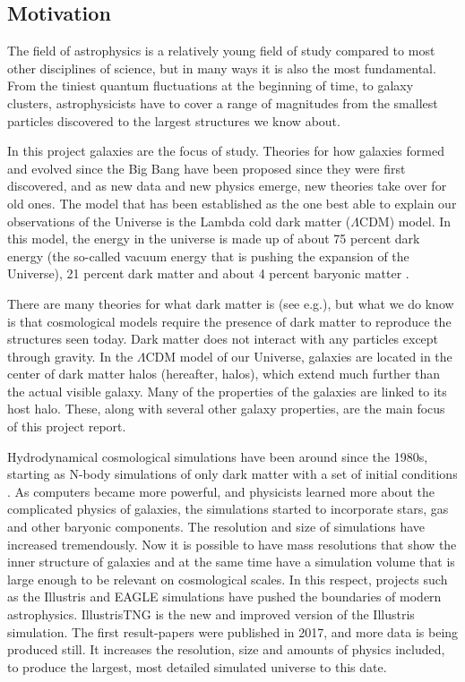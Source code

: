 
\noindent
\subsection{Motivation}
The field of astrophysics is a relatively young field of study compared to most other disciplines of science, but in many ways it is also the most fundamental. From the tiniest quantum fluctuations at the beginning of time, to galaxy clusters, astrophysicists have to cover a range of magnitudes from the smallest particles discovered to the largest structures we know about. 

In this project galaxies are the focus of study. Theories for how galaxies formed and evolved since the Big Bang have been proposed since they were first discovered, and as new data and new physics emerge, new theories take over for old ones. The model that has been established as the one best able to explain our observations of the Universe is the Lambda cold dark matter ($\Lambda$CDM) model. In this model, the energy in the universe is made up of about 75 percent dark energy (the so-called vacuum energy that is pushing the expansion of the Universe), 21 percent dark matter and about 4 percent baryonic matter \parencite{white}. 

There are many theories for what dark matter is (see e.g.\cite{Boveia2018}), but what we do know is that cosmological models require the presence of dark matter to reproduce the structures seen today. Dark matter does not interact with any particles except through gravity. In the $\Lambda$CDM model of our Universe, galaxies are located in the center of dark matter halos (hereafter, halos), which extend much further than the actual visible galaxy. Many of the properties of the galaxies are linked to its host halo. These, along with several other galaxy properties, are the main focus of this project report.

Hydrodynamical cosmological simulations have been around since the 1980s, starting as N-body simulations of only dark matter with a set of initial conditions \parencite{Frenk1983}. As computers became more powerful, and physicists learned more about the complicated physics of galaxies, the simulations started to incorporate stars, gas and other baryonic components. The resolution and size of simulations have increased tremendously. Now it is possible to have mass resolutions that show the inner structure of galaxies and at the same time have a simulation volume that is large enough to be relevant on cosmological scales. In this respect, projects such as the Illustris and EAGLE simulations have pushed the boundaries of modern astrophysics. IllustrisTNG is the new and improved version of the Illustris simulation. The first result-papers were published in 2017, and more data is being produced still. It increases the resolution, size and amounts of physics included, to produce the largest, most detailed simulated universe to this date. 

